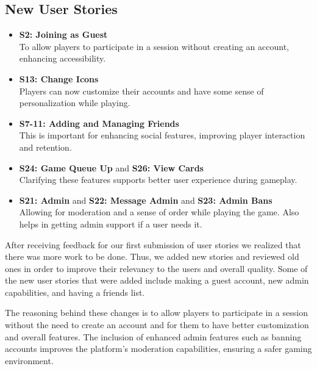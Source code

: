 \subsection{New User Stories}
\begin{itemize}
    \item \textbf{S2: Joining as Guest} \\
    To allow players to participate in a session without creating an account, enhancing accessibility.
    \item \textbf{S13: Change Icons} \\
    Players can now customize their accounts and have some sense of personalization while playing.
    \item \textbf{S7-11: Adding and Managing Friends} \\
    This is important for enhancing social features, improving player interaction and retention.
    \item \textbf{S24: Game Queue Up} and \textbf{S26: View Cards} \\
    Clarifying these features supports better user experience during gameplay.
    \item \textbf{S21: Admin} and \textbf{S22: Message Admin} and \textbf{S23: Admin Bans} \\
    Allowing for moderation and a sense of order while playing the game. Also helps in getting admin support if a user needs it.
\end{itemize}

After receiving feedback for our first submission of user stories we realized that there was more work to be done. Thus, we added new stories and reviewed old ones in order to improve their relevancy to the users and overall quality. Some of the new user stories that were added include making a guest account, new admin capabilities, and having a friends list. 

The reasoning behind these changes is to allow players to participate in a session without the need to create an account and for them to have better customization and overall features. The inclusion of enhanced admin features such as banning accounts improves the platform’s moderation capabilities, ensuring a safer gaming environment.

\pagebreak
